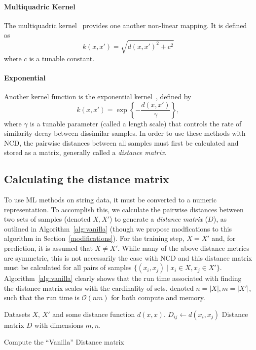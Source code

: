 \documentclass[preprint,12pt]{elsarticle}
\begin{document}
\paragraph{Multiquadric Kernel}
\label{multiquadric_kernel}
The multiquadric kernel~\cite{kernels} provides one another non-linear mapping. 
It is defined as 
$$
k(x, x') = \sqrt{d(x,x') ^2 + c^2}
$$
where $c$ is a tunable constant. 


\paragraph{Exponential}
\label{exp_kernel}

Another kernel function is the exponential kernel~\cite{kernels}, defined by
$$
    k(x, x') = \exp\left\{-\frac{d(x,x')}{\gamma}\right\},
$$
where $\gamma$ is a tunable parameter (called a length scale) that controls the rate of similarity decay between dissimilar samples. In order to use these methods with NCD, the pairwise distances between all samples must first be calculated and stored as a matrix, generally called a \textit{distance matrix}.



\subsection{Calculating the distance matrix}
\label{distance_matrix}

To use ML methods on string data, it must be converted to a numeric representation. 
To accomplish this, we calculate the pairwise distances between two sets of samples (denoted $X, X'$) to generate a \textit{distance matrix} ($D$), as outlined in Algorithm~\ref{alg:vanilla} (though we propose modfications to this algorithm in Section~\ref{modifications}).
For the training step, $X = X'$ and, for prediction, it is assumed that $X \neq X'$. 
While many of the above distance metrics are symmetric, this is not necessarily the case with NCD and this distance matrix must be calculated for all pairs of samples $\{(x_i, x_j) \mid x_i \in X, x_j \in X'\}$. 
Algorithm~\ref{alg:vanilla} clearly shows that the run time associated with finding the distance matrix scales with the cardinality of sets, denoted $n = | X |, m = | X' |$, such that the run time is $\mathcal{O}(nm)$ for both compute and memory.
\begin{algorithm}
    \begin{algorithmic}
        \Require Datasets $X$, $X'$ and some distance function $d(x,x)$.
                \State $D_{ij} \gets d(x_i, x_j)$
            \EndFor
        \EndFor
        \State \Return Distance matrix $D$ with dimensions $m,n$.
    \end{algorithmic}
    \caption{Compute the ``Vanilla'' Distance matrix}
    \label{alg:vanilla}
\end{algorithm}
\end{document}
